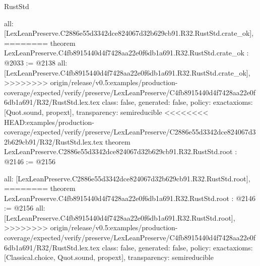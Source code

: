\begin{lexlean}{RustStd}
\begin{coremodule}
{\begin{coremodule}
{{{{{{  all: [LexLeanPreserve.C2886e55d3342dce824067d32b629cb91.R32.RustStd.crate_ok],
========
theorem LexLeanPreserve.C4fb8915440d4f7428aa22e0f6db1a691.R32.RustStd.crate_ok : @2033 := @2138 {
  all: [LexLeanPreserve.C4fb8915440d4f7428aa22e0f6db1a691.R32.RustStd.crate_ok],
>>>>>>>> origin/release/v0.5:examples/production-coverage/expected/verify/preserve/LexLeanPreserve/C4fb8915440d4f7428aa22e0f6db1a691/R32/RustStd.lex.tex
  class: false,
  generated: false,
  policy: exact{axioms: [Quot.sound, propext]},
  transparency: semireducible
}
<<<<<<<< HEAD:examples/production-coverage/expected/verify/preserve/LexLeanPreserve/C2886e55d3342dce824067d32b629cb91/R32/RustStd.lex.tex
theorem LexLeanPreserve.C2886e55d3342dce824067d32b629cb91.R32.RustStd.root : @2146 := @2156 {
  all: [LexLeanPreserve.C2886e55d3342dce824067d32b629cb91.R32.RustStd.root],
========
theorem LexLeanPreserve.C4fb8915440d4f7428aa22e0f6db1a691.R32.RustStd.root : @2146 := @2156 {
  all: [LexLeanPreserve.C4fb8915440d4f7428aa22e0f6db1a691.R32.RustStd.root],
>>>>>>>> origin/release/v0.5:examples/production-coverage/expected/verify/preserve/LexLeanPreserve/C4fb8915440d4f7428aa22e0f6db1a691/R32/RustStd.lex.tex
  class: false,
  generated: false,
  policy: exact{axioms: [Classical.choice, Quot.sound, propext]},
  transparency: semireducible
}

}}}}}}}
\end{coremodule}}
\end{coremodule}
\end{lexlean}
